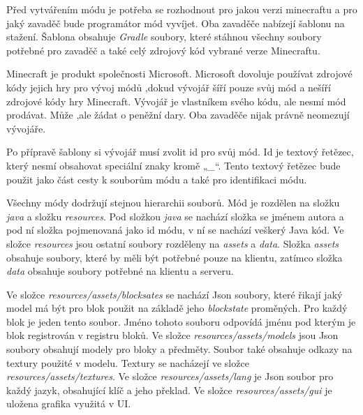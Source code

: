 \documentclass[FM,RP]{tulthesis}
\begin{document}
\par    Před vytvářením módu je potřeba se rozhodnout pro jakou verzi minecraftu a pro jaký zavaděč bude programátor mód vyvíjet. Oba zavaděče nabízejí šablonu na stažení. Šablona obsahuje \textit{Gradle} soubory, které stáhnou všechny soubory potřebné pro zavaděč a také celý zdrojový kód vybrané verze Minecraftu. 
\par    Minecraft je produkt společnosti Microsoft. Microsoft dovoluje používat zdrojové kódy jejich hry pro vývoj módů ,dokud vývojář šíří pouze svůj mód a nešíří zdrojové kódy hry Minecraft. Vývojář je vlastníkem svého kódu, ale nesmí mód prodávat. Může ,ale žádat o peněžní dary. Oba zavaděče nijak právně neomezují  vývojáře.
\par    Po přípravě šablony si vývojář musí zvolit id pro svůj mód. Id je textový řetězec, který nesmí obsahovat speciální znaky kromě „\textit{\_}“.  Tento textový řetězec bude použit jako část cesty k souborům módu a také pro identifikaci módu. 
\par    Všechny módy dodržují stejnou hierarchii souborů. Mód je rozdělen na složku \textit{java} a složku \textit{resources}.  Pod složkou \textit{java} se nachází složka se jménem autora a pod ní složka pojmenovaná jako id módu, v ní se nachází veškerý Java kód. Ve složce \textit{resources} jsou ostatní soubory rozděleny na \textit{assets} a \textit{data}. Složka \textit{assets} obsahuje soubory, které by měli být potřebné pouze na klientu, zatímco složka \textit{data} obsahuje soubory potřebné na klientu a serveru.
\par    Ve složce \textit{resources/assets/blocksates} se nachází Json soubory, které řikají jaký model má být pro blok použit na základě jeho \textit{blockstate} proměných. Pro každý blok je jeden tento soubor. Jméno tohoto souboru odpovídá jménu pod kterým je blok registrován v registru bloků. Ve složce  \textit{resources/assets/models} jsou Json soubory  obsahují modely pro bloky a předměty. Soubor také obsahuje odkazy na textury použité v modelu. Textury se nacházejí ve složce \textit{resources/assets/textures}. Ve složce \textit{resources/assets/lang} je Json soubor pro každý jazyk, obsahující klíč a jeho překlad. Ve  složce \textit{resources/assets/gui} je uložena grafika využitá v UI.
\par 

\begin{comment}
\textit{Named binary tag} je jednoduchý hiearchický formát pro ukládání dat.
\end{comment}
\end{document}
